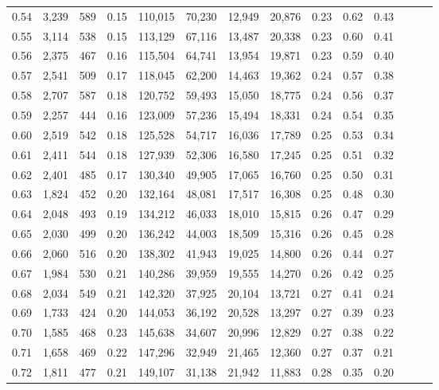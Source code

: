 \begin{tabular}{rrrrrrrrrrrrrr}
0.54 &  3,239 &  589 &  0.15 &  110,015 &   70,230 &  12,949 &  20,876 &  0.23 &  0.62 &      0.43 \\
0.55 &  3,114 &  538 &  0.15 &  113,129 &   67,116 &  13,487 &  20,338 &  0.23 &  0.60 &      0.41 \\
0.56 &  2,375 &  467 &  0.16 &  115,504 &   64,741 &  13,954 &  19,871 &  0.23 &  0.59 &      0.40 \\
0.57 &  2,541 &  509 &  0.17 &  118,045 &   62,200 &  14,463 &  19,362 &  0.24 &  0.57 &      0.38 \\
0.58 &  2,707 &  587 &  0.18 &  120,752 &   59,493 &  15,050 &  18,775 &  0.24 &  0.56 &      0.37 \\
0.59 &  2,257 &  444 &  0.16 &  123,009 &   57,236 &  15,494 &  18,331 &  0.24 &  0.54 &      0.35 \\
0.60 &  2,519 &  542 &  0.18 &  125,528 &   54,717 &  16,036 &  17,789 &  0.25 &  0.53 &      0.34 \\
0.61 &  2,411 &  544 &  0.18 &  127,939 &   52,306 &  16,580 &  17,245 &  0.25 &  0.51 &      0.32 \\
0.62 &  2,401 &  485 &  0.17 &  130,340 &   49,905 &  17,065 &  16,760 &  0.25 &  0.50 &      0.31 \\
0.63 &  1,824 &  452 &  0.20 &  132,164 &   48,081 &  17,517 &  16,308 &  0.25 &  0.48 &      0.30 \\
0.64 &  2,048 &  493 &  0.19 &  134,212 &   46,033 &  18,010 &  15,815 &  0.26 &  0.47 &      0.29 \\
0.65 &  2,030 &  499 &  0.20 &  136,242 &   44,003 &  18,509 &  15,316 &  0.26 &  0.45 &      0.28 \\
0.66 &  2,060 &  516 &  0.20 &  138,302 &   41,943 &  19,025 &  14,800 &  0.26 &  0.44 &      0.27 \\
0.67 &  1,984 &  530 &  0.21 &  140,286 &   39,959 &  19,555 &  14,270 &  0.26 &  0.42 &      0.25 \\
0.68 &  2,034 &  549 &  0.21 &  142,320 &   37,925 &  20,104 &  13,721 &  0.27 &  0.41 &      0.24 \\
0.69 &  1,733 &  424 &  0.20 &  144,053 &   36,192 &  20,528 &  13,297 &  0.27 &  0.39 &      0.23 \\
0.70 &  1,585 &  468 &  0.23 &  145,638 &   34,607 &  20,996 &  12,829 &  0.27 &  0.38 &      0.22 \\
0.71 &  1,658 &  469 &  0.22 &  147,296 &   32,949 &  21,465 &  12,360 &  0.27 &  0.37 &      0.21 \\
0.72 &  1,811 &  477 &  0.21 &  149,107 &   31,138 &  21,942 &  11,883 &  0.28 &  0.35 &      0.20 \\

\end{tabular}
